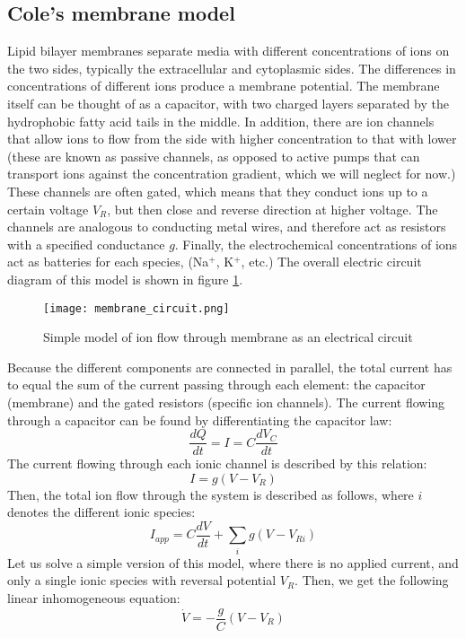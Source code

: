 \documentclass[11pt]{book}
\begin{document}
\subsection{Cole's membrane model}
Lipid bilayer membranes separate media with different concentrations of ions on the two sides, typically the extracellular and cytoplasmic sides. The differences in concentrations of different ions produce a membrane potential. The membrane itself can be thought of as a capacitor, with two charged layers separated by the hydrophobic fatty acid tails in the middle. In addition, there are ion channels that allow ions to flow from the side with higher concentration to that with lower (these are known as passive channels, as opposed to active pumps that can transport ions against the concentration gradient, which we will neglect for now.) These channels are often gated, which means that they conduct ions up to a certain voltage $V_R$, but then close and reverse direction at higher voltage. The channels are analogous to conducting metal wires, and therefore act as resistors with a specified conductance $g$. Finally, the electrochemical concentrations of ions act as batteries for each species, (Na$^+$, K$^+$, etc.) The overall electric circuit diagram of this model is shown in figure \ref{fig:membrane_potential}.
\begin{figure}[htbp] %
   \centering
   \texttt{[image: membrane\_circuit.png]}
   \caption{Simple model of ion flow through membrane as an electrical circuit}
   \label{fig:membrane_potential}
\end{figure}
Because the different components are connected in parallel, the total current has to equal the sum of the current passing through each element: the capacitor (membrane) and the gated resistors (specific ion channels). The current flowing through a capacitor can be found by differentiating the capacitor law:
$$ \frac{dQ}{dt} = I = C \frac{dV_C}{dt}$$
The current flowing through each ionic channel is described by this relation:
$$ I = g (V-V_R)$$
Then, the total ion flow through the system is described as follows, where $i$ denotes the different ionic species:
\begin{equation}
I_{app} = C \frac{dV}{dt} + \sum_i g (V-V_{Ri})
\end{equation}
Let us solve a simple version of this model, where there is no applied current, and only a single ionic species with reversal potential $V_R$. Then, we get the following linear inhomogeneous equation:
$$ \dot V = - \frac{g}{C} (V-V_R)$$
\end{document}
